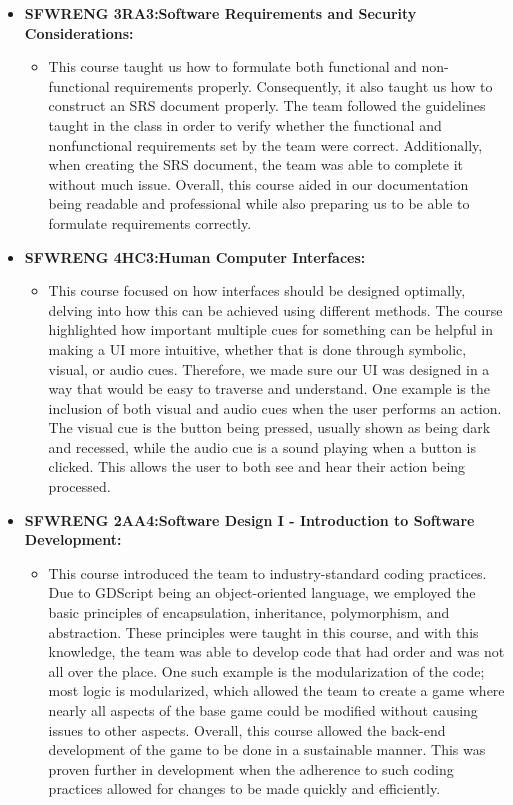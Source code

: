 \documentclass{article}
\begin{document}
\begin{itemize}
	\item \textbf{SFWRENG 3RA3:Software Requirements and Security Considerations: } 
	\begin{itemize}
		\item This course taught us how to formulate both functional and non-functional requirements properly. Consequently, it also taught us how to construct an SRS document properly. The team followed the guidelines taught in the class in order to verify whether the functional and nonfunctional requirements set by the team were correct. Additionally, when creating the SRS document, the team was able to complete it without much issue. Overall, this course aided in our documentation being readable and professional while also preparing us to be able to formulate requirements correctly.
	\end{itemize}
    \item \textbf{SFWRENG 4HC3:Human Computer Interfaces:} 
    \begin{itemize}
        \item This course focused on how interfaces should be designed optimally, delving into how this can be achieved using different methods. The course highlighted how important multiple cues for something can be helpful in making a UI more intuitive, whether that is done through symbolic, visual, or audio cues. Therefore, we made sure our UI was designed in a way that would be easy to traverse and understand. One example is the inclusion of both visual and audio cues when the user performs an action. The visual cue is the button being pressed, usually shown as being dark and recessed, while the audio cue is a sound playing when a button is clicked. This allows the user to both see and hear their action being processed.   
    \end{itemize}
    \item \textbf{SFWRENG 2AA4:Software Design I - Introduction to Software Development:} 
    \begin{itemize}
        \item This course introduced the team to industry-standard coding practices. Due to GDScript being an object-oriented language, we employed the basic principles of encapsulation, inheritance, polymorphism, and abstraction. These principles were taught in this course, and with this knowledge, the team was able to develop code that had order and was not all over the place. One such example is the modularization of the code; most logic is modularized, which allowed the team to create a game where nearly all aspects of the base game could be modified without causing issues to other aspects. Overall, this course allowed the back-end development of the game to be done in a sustainable manner. This was proven further in development when the adherence to such coding practices allowed for changes to be made quickly and efficiently.
    \end{itemize}
\end{itemize}
\end{document}
